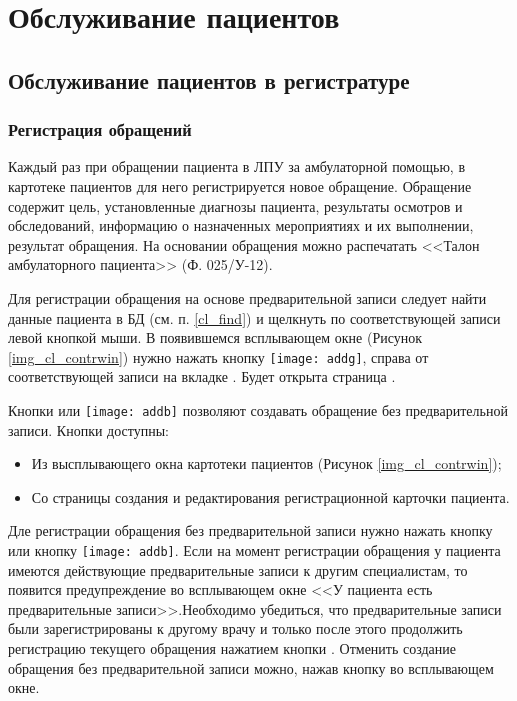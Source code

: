 \newpage
\section{Обслуживание пациентов}
{
\subsection{Обслуживание пациентов в регистратуре}
\subsubsection {Регистрация обращений} \label{pol_obr}

Каждый раз при обращении пациента в ЛПУ за амбулаторной помощью, в картотеке пациентов для него регистрируется новое обращение. Обращение содержит цель, установленные диагнозы пациента, результаты осмотров и обследований, информацию о назначенных мероприятиях и их выполнении, результат обращения. На основании обращения можно распечатать <<Талон амбулаторного пациента>> (Ф. 025\slash У-12).

Для регистрации обращения на основе предварительной записи следует найти данные пациента в БД (см. п. \ref{cl_find}) и щелкнуть по соответствующей записи левой кнопкой мыши. В появившемся всплывающем окне (Рисунок \ref{img_cl_contrwin}) нужно нажать кнопку \texttt{[image: addg]}, справа от соответствующей записи на вкладке . Будет открыта страница .

Кнопки  или \texttt{[image: addb]} позволяют создавать обращение без предварительной записи. Кнопки доступны:
\begin{itemize}
 \item Из высплывающего окна картотеки пациентов (Рисунок \ref{img_cl_contrwin});
 \item Со страницы создания и редактирования регистрационной карточки пациента. 
\end{itemize}

Дле регистрации обращения без предварительной записи нужно нажать кнопку  или кнопку \texttt{[image: addb]}. Если на момент регистрации обращения у пациента имеются действующие предварительные записи к другим специалистам, то появится предупреждение во всплывающем окне <<У пациента есть предварительные записи>>.Необходимо убедиться, что предварительные записи были зарегистрированы к другому врачу и только после этого продолжить регистрацию текущего обращения нажатием кнопки . Отменить создание обращения без предварительной записи можно, нажав кнопку   во всплывающем окне.

}
